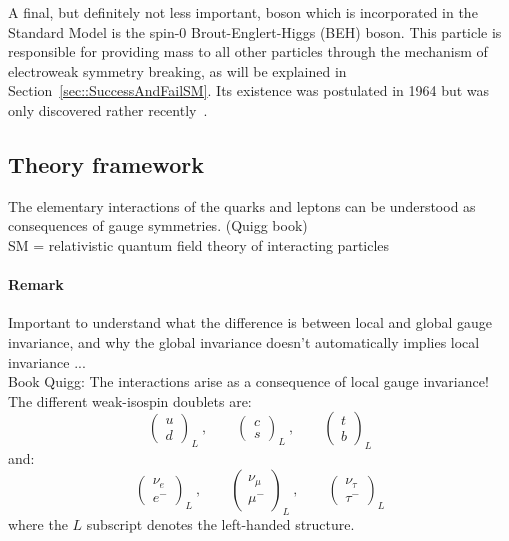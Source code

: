 A final, but definitely not less important, boson which is incorporated in the Standard Model is the spin-0 Brout-Englert-Higgs (BEH) boson. This particle is responsible for providing mass to all other particles through the mechanism of electroweak symmetry breaking, as will be explained in Section~\ref{sec::SuccessAndFailSM}. Its existence was postulated in 1964 but was only discovered rather recently~\cite{Higgs}.

\subsection{Theory framework}
The elementary interactions of the quarks and leptons can be understood as consequences of gauge symmetries. (Quigg book)\\
SM = relativistic quantum field theory of interacting particles\\

\paragraph{Remark}
Important to understand what the difference is between local and global gauge invariance, and why the global invariance doesn't automatically implies local invariance ...\\
Book Quigg: The interactions arise as a consequence of local gauge invariance!\\

The different weak-isospin doublets are:
\begin{equation}
 \begin{pmatrix} u \\ d \end{pmatrix}_{L}~, \qquad \begin{pmatrix} c \\ s \end{pmatrix}_{L}~, \qquad \begin{pmatrix} t \\ b \end{pmatrix}_{L}
\end{equation}
and:
\begin{equation}
 \begin{pmatrix} \nu_{e} \\ e^{-} \end{pmatrix}_{L}~, \qquad \begin{pmatrix} \nu_{\mu} \\ \mu^{-} \end{pmatrix}_{L}~, \qquad \begin{pmatrix} \nu_{\tau} \\ \tau^{-} \end{pmatrix}_{L}
\end{equation}
where the $L$ subscript denotes the left-handed structure.

